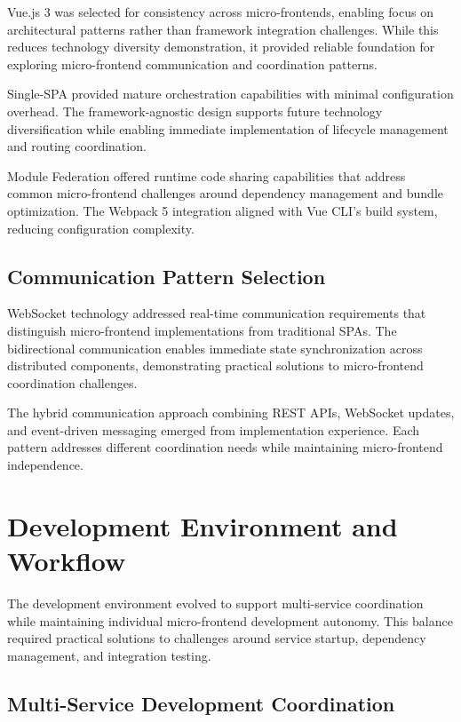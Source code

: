 \documentclass[12pt,a4paper]{report}
\begin{document}
Vue.js 3 was selected for consistency across micro-frontends, enabling focus on architectural patterns rather than framework integration challenges. While this reduces technology diversity demonstration, it provided reliable foundation for exploring micro-frontend communication and coordination patterns.

Single-SPA provided mature orchestration capabilities with minimal configuration overhead. The framework-agnostic design supports future technology diversification while enabling immediate implementation of lifecycle management and routing coordination.

Module Federation offered runtime code sharing capabilities that address common micro-frontend challenges around dependency management and bundle optimization. The Webpack 5 integration aligned with Vue CLI's build system, reducing configuration complexity.

\subsection{Communication Pattern Selection}

WebSocket technology addressed real-time communication requirements that distinguish micro-frontend implementations from traditional SPAs. The bidirectional communication enables immediate state synchronization across distributed components, demonstrating practical solutions to micro-frontend coordination challenges.

The hybrid communication approach combining REST APIs, WebSocket updates, and event-driven messaging emerged from implementation experience. Each pattern addresses different coordination needs while maintaining micro-frontend independence.

\section{Development Environment and Workflow}

The development environment evolved to support multi-service coordination while maintaining individual micro-frontend development autonomy. This balance required practical solutions to challenges around service startup, dependency management, and integration testing.

\subsection{Multi-Service Development Coordination}
\end{document}
